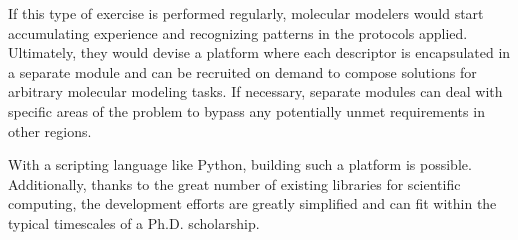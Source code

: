 If this type of exercise is performed regularly, molecular modelers would start accumulating experience and recognizing patterns in the protocols applied. Ultimately, they would devise a platform where each descriptor is encapsulated in a separate module and can be recruited on demand to compose solutions for arbitrary molecular modeling tasks. If necessary, separate modules can deal with specific areas of the problem to bypass any potentially unmet requirements in other regions.

With a scripting language like Python, building such a platform is possible. Additionally, thanks to the great number of existing libraries for scientific computing, the development efforts are greatly simplified and can fit within the typical timescales of a Ph.D. scholarship.